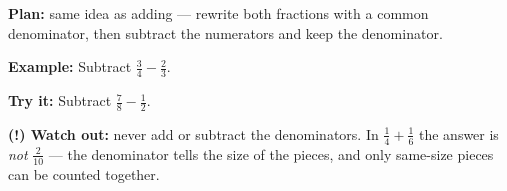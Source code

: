 \documentclass[12pt]{article}
\begin{document}

\begin{formulabox}
\textbf{Plan:} same idea as adding --- rewrite both fractions with a common
denominator, then subtract the numerators and keep the denominator.
\end{formulabox}

\begin{examplebox}
\textbf{Example:} \quad Subtract $\tfrac{3}{4} - \tfrac{2}{3}$.
\end{examplebox}

\begin{tryitbox}
\textbf{Try it:} \quad Subtract $\tfrac{7}{8} - \tfrac{1}{2}$.\\[2pt]
\end{tryitbox}

\begin{watchoutbox}
\textbf{(!) Watch out:} never add or subtract the denominators. In
$\tfrac{1}{4} + \tfrac{1}{6}$ the answer is \emph{not} $\tfrac{2}{10}$ ---
the denominator tells the size of the pieces, and only same-size pieces can
be counted together.
\end{watchoutbox}
\end{document}
